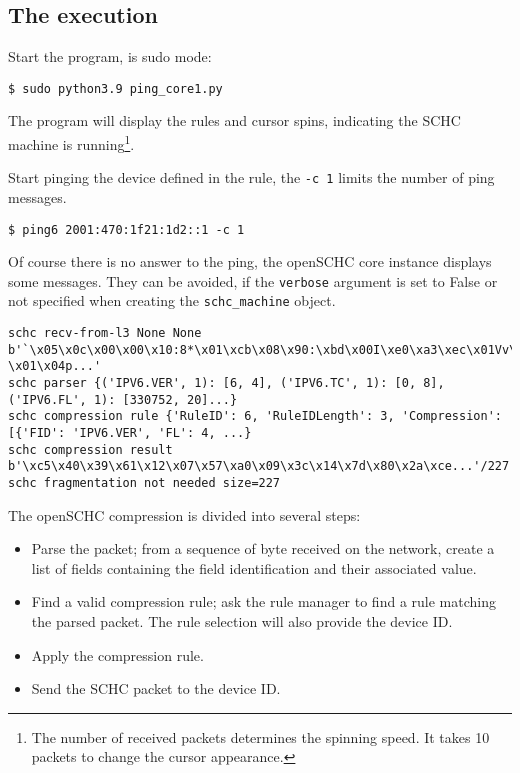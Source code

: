 \documentclass[onecolumn,12pt]{book}
\newcounter{c}
\begin{document}
\subsection{The execution}

Start the program, is sudo mode:

\begin{lstlisting}
$ sudo python3.9 ping_core1.py 
\end{lstlisting}

The program will display the rules and cursor spins, indicating the SCHC machine is running\footnote{The number of received packets determines the spinning speed. It takes 10 packets to change the cursor appearance.}. 

Start pinging the device defined in the rule, the \texttt{-c 1} limits the number of ping messages. 

\begin{lstlisting}
$ ping6 2001:470:1f21:1d2::1 -c 1
\end{lstlisting}

Of course there is no answer to the ping, the openSCHC core instance displays some messages. They can be avoided, if the \texttt{verbose} argument is set to False or not specified when creating the \texttt{schc\_machine} object. 

\begin{lstlisting}[basicstyle=\ttfamily\tiny]
schc recv-from-l3 None None b'`\x05\x0c\x00\x00\x10:8*\x01\xcb\x08\x90:\xbd\x00I\xe0\xa3\xec\x01Vv\x9c \x01\x04p...'
schc parser {('IPV6.VER', 1): [6, 4], ('IPV6.TC', 1): [0, 8], ('IPV6.FL', 1): [330752, 20]...} 
schc compression rule {'RuleID': 6, 'RuleIDLength': 3, 'Compression': [{'FID': 'IPV6.VER', 'FL': 4, ...}
schc compression result b'\xc5\x40\x39\x61\x12\x07\x57\xa0\x09\x3c\x14\x7d\x80\x2a\xce...'/227
schc fragmentation not needed size=227
\end{lstlisting}
 
The openSCHC compression is divided into several steps:
\begin{itemize}
\item Parse the packet; from a sequence of byte received on the network, create a list of fields containing the field identification and their associated value.
\item Find a valid compression rule; ask the rule manager to find a rule matching the parsed packet. The rule selection will also provide the device ID.
\item Apply the compression rule.
\item Send the SCHC packet to the device ID.
\end{itemize}
\end{document}
